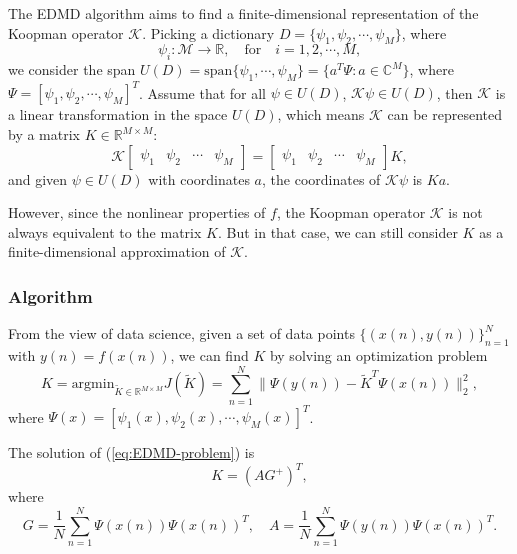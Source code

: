 \documentclass[en, bibend=bibtex]{elegantpaper}
\theoremstyle{plain}
\begin{document}
The EDMD algorithm aims to find a finite-dimensional
representation of the Koopman operator $\mathcal{K}$.
Picking a dictionary $D = \{\psi_1,\psi_2,\cdots,\psi_M\}$,
where
\begin{equation*}
  \psi_i: \mathcal{M} \rightarrow \mathbb{R},
  \quad \text{for} \quad i = 1,2,\cdots, M,
\end{equation*}
we consider the span $U(D) = \text{span}\{\psi_1,\cdots,\psi_M\} = \{a^T\Psi:a \in \mathbb{C}^M\}$,
where $\Psi = [\psi_1,\psi_2,\cdots,\psi_M]^T$.
Assume that for all $\psi \in U(D)$,
$\mathcal{K} \psi \in U(D)$,
then $\mathcal{K}$ is a linear transformation in the space $U(D)$,
which means $\mathcal{K}$ can be represented
by a matrix $K \in \mathbb{R}^{M \times M}$:
\begin{equation*}
  \mathcal{K} \left[
    \begin{array}{cccc}
      \psi_1&\psi_2&\cdots&\psi_M
    \end{array}
  \right] = \left[
    \begin{array}{cccc}
      \psi_1&\psi_2&\cdots&\psi_M
    \end{array}
  \right]K,
\end{equation*}
and given $\psi \in U(D)$ with coordinates $a$,
the coordinates of $\mathcal{K} \psi$ is $Ka$.

However, since the nonlinear properties of $f$,
the Koopman operator $\mathcal{K}$ is not always equivalent to the matrix $K$.
But in that case, we can still consider $K$ as a finite-dimensional
approximation of $\mathcal{K}$.

\subsubsection{Algorithm}

From the view of data science,
given a set of data points $\{(x(n), y(n))\}_{n = 1}^N$
with $y(n) = f(x(n))$,
we can find $K$ by solving an optimization problem
\begin{equation}
  \label{eq:EDMD-problem}
  K = \text{argmin}_{\tilde{K} \in \mathbb{R}^{M \times M}} J(\tilde{K})
  = \sum\limits_{n = 1}^N \|\Psi(y(n)) - \tilde{K}^T \Psi(x(n))\|_2^2,
\end{equation}
where $\Psi(x) = [\psi_1(x), \psi_2(x),\cdots,\psi_M(x)]^T$.

\begin{proposition}
  The solution of (\ref{eq:EDMD-problem}) is
  \begin{equation*}
    K = (AG^+)^T,
  \end{equation*}
  where
  \begin{equation*}
    G = \frac{1}{N} \sum\limits_{n = 1}^N \Psi(x(n)) \Psi(x(n))^T,
    \quad A = \frac{1}{N} \sum\limits_{n = 1}^N \Psi(y(n)) \Psi(x(n))^T.
  \end{equation*}
\end{proposition}
\end{document}
